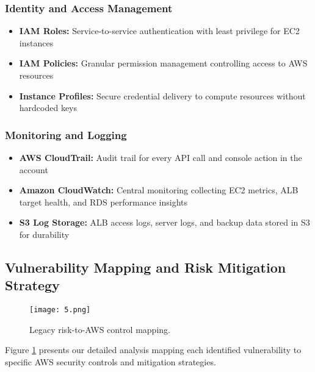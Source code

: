 \documentclass[12pt]{article}
\begin{document}
\subsubsection{Identity and Access Management}
\begin{itemize}
\item \textbf{IAM Roles:} Service-to-service authentication with least privilege for EC2 instances
\item \textbf{IAM Policies:} Granular permission management controlling access to AWS resources
\item \textbf{Instance Profiles:} Secure credential delivery to compute resources without hardcoded keys
\end{itemize}

\subsubsection{Monitoring and Logging}
\begin{itemize}
\item \textbf{AWS CloudTrail:} Audit trail for every API call and console action in the account
\item \textbf{Amazon CloudWatch:} Central monitoring collecting EC2 metrics, ALB target health, and RDS performance insights
\item \textbf{S3 Log Storage:} ALB access logs, server logs, and backup data stored in S3 for durability
\end{itemize}

\subsection{Vulnerability Mapping and Risk Mitigation Strategy}

\begin{figure}[H]
\centering
\texttt{[image: 5.png]}
\caption{Legacy risk-to-AWS control mapping.}
\label{fig:vulnerability_mapping}
\end{figure}

Figure \ref{fig:vulnerability_mapping} presents our detailed analysis mapping each identified vulnerability to specific AWS security controls and mitigation strategies.
\end{document}
